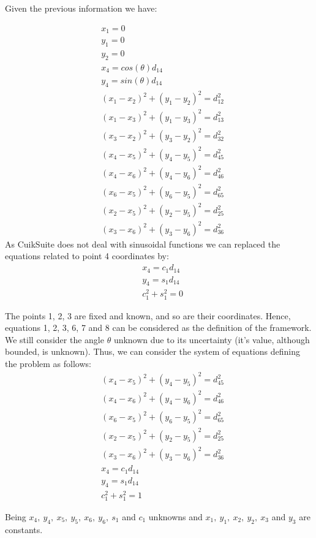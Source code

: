 \documentclass[paper=a4, fontsize=11pt]{scrartcl} %
\begin{document}
Given the previous information we have:

\begin{align}
& x_1 = 0\\
& y_1 = 0\\
& y_2 = 0\\
& x_4 = cos(\theta)d_{14}\\
& y_4 = sin(\theta)d_{14}\\
& (x_1-x_2)^2+(y_1-y_2)^2 = d_{12}^2\\
& (x_1-x_3)^2+(y_1-y_3)^2 = d_{13}^2\\
& (x_3-x_2)^2+(y_3-y_2)^2 = d_{32}^2\\
& (x_4-x_5)^2+(y_4-y_5)^2 = d_{45}^2\\
& (x_4-x_6)^2+(y_4-y_6)^2 = d_{46}^2\\
& (x_6-x_5)^2+(y_6-y_5)^2 = d_{65}^2\\
& (x_2-x_5)^2+(y_2-y_5)^2 = d_{25}^2\\
& (x_3-x_6)^2+(y_3-y_6)^2 = d_{36}^2
\end{align}
As CuikSuite does not deal with sinusoidal functions we can replaced the equations related to point 4 coordinates by:
\begin{align}
& x_4 = c_1d_{14}\\
& y_4 = s_1d_{14}\\
& c_1^2+s_1^2=0
\end{align}

The points 1, 2, 3 are fixed and known, and so are their coordinates. Hence, equations 1, 2, 3, 6, 7 and 8 can be considered as the definition of the framework. We still consider the angle $\theta$ unknown due to its uncertainty (it's value, although bounded, is unknown). Thus, we can consider the system of equations defining the problem as follows:
\begin{align}
\label{syseq1}
& (x_4-x_5)^2+(y_4-y_5)^2 = d_{45}^2\\
& (x_4-x_6)^2+(y_4-y_6)^2 = d_{46}^2\\
& (x_6-x_5)^2+(y_6-y_5)^2 = d_{65}^2\\
& (x_2-x_5)^2+(y_2-y_5)^2 = d_{25}^2\\
& (x_3-x_6)^2+(y_3-y_6)^2 = d_{36}^2\\
& x_4 = c_1d_{14}\\
& y_4 = s_1d_{14}\\
& c_1^2+s_1^2=1
\label{syseq2}
\end{align}

Being $x_4,\ y_4,\ x_5,\ y_5,\ x_6,\ y_6,\ s_1$ and $c_1$ unknowns and $x_1,\ y_1,\ x_2,\ y_2,\ x_3$ and $y_3$ are constants.
\end{document}
